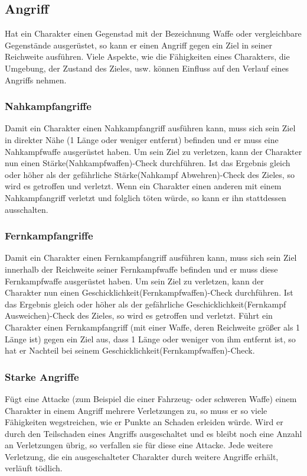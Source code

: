 \subsection{Angriff}
Hat ein Charakter einen Gegenstad mit der Bezeichnung \glqq Waffe\grqq{} oder vergleichbare Gegenstände ausgerüstet, so kann er einen Angriff gegen ein Ziel in seiner Reichweite ausführen. Viele Aspekte, wie die Fähigkeiten eines Charakters, die Umgebung, der Zustand des Zieles, usw. können Einfluss auf den Verlauf eines Angriffs nehmen.
\subsubsection{Nahkampfangriffe}
Damit ein Charakter einen Nahkampfangriff ausführen kann, muss sich sein Ziel in direkter Nähe (1 Länge oder weniger entfernt) befinden und er muss eine Nahkampfwaffe ausgerüstet haben. Um sein Ziel zu verletzen, kann der Charakter nun einen Stärke(Nahkampfwaffen)-Check durchführen. Ist das Ergebnis gleich oder höher als der gefährliche Stärke(Nahkampf Abwehren)-Check des Zieles, so wird es getroffen und verletzt. Wenn ein Charakter einen anderen mit einem Nahkampfangriff verletzt und folglich töten würde, so kann er ihn stattdessen ausschalten.
\subsubsection{Fernkampfangriffe}
Damit ein Charakter einen Fernkampfangriff ausführen kann, muss sich sein Ziel innerhalb der Reichweite seiner Fernkampfwaffe befinden und er muss diese Fernkampfwaffe ausgerüstet haben. Um sein Ziel zu verletzen, kann der Charakter nun einen Geschicklichkeit(Fernkampfwaffen)-Check durchführen. Ist das Ergebnis gleich oder höher als der gefährliche Geschicklichkeit(Fernkampf Ausweichen)-Check des Zieles, so wird es getroffen und verletzt. Führt ein Charakter einen Fernkampfangriff (mit einer Waffe, deren Reichweite größer als 1 Länge ist) gegen ein Ziel aus, dass 1 Länge oder weniger von ihm entfernt ist, so hat er Nachteil bei seinem Geschicklichkeit(Fernkampfwaffen)-Check.
\subsubsection{Starke Angriffe}
Fügt eine Attacke (zum Beispiel die einer Fahrzeug- oder schweren Waffe) einem Charakter in einem Angriff mehrere Verletzungen zu, so muss er so viele Fähigkeiten wegstreichen, wie er Punkte an Schaden erleiden würde. Wird er durch den Teilschaden eines Angriffs ausgeschaltet und es bleibt noch eine Anzahl an Verletzungen übrig, so verfallen sie für diese eine Attacke. Jede weitere Verletzung, die ein ausgeschalteter Charakter durch weitere Angriffe erhält, verläuft tödlich.
